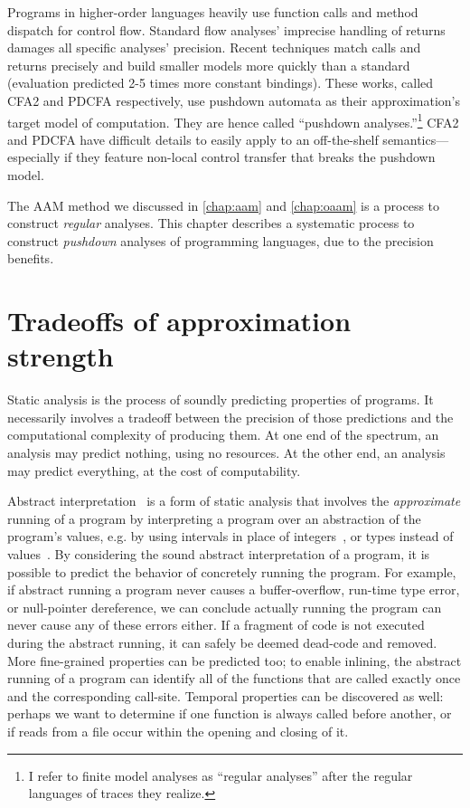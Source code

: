 Programs in higher-order languages heavily use function calls and method dispatch for control flow.
Standard flow analyses' imprecise handling of returns damages all specific analyses' precision.
Recent techniques match calls and returns precisely \citep{ianjohnson:vardoulakis-lmcs11, dvanhorn:Earl2010Pushdown} and build smaller models more quickly than a standard \zcfa (evaluation predicted 2-5 times more constant bindings).
These works, called CFA2 and PDCFA respectively, use pushdown automata as their approximation's target model of computation.
They are hence called ``pushdown analyses.''\footnote{I refer to finite model analyses as ``regular analyses'' after the regular languages of traces they realize.}
CFA2 and PDCFA have difficult details to easily apply to an off-the-shelf semantics---especially if they feature non-local control transfer that breaks the pushdown model.


The AAM method we discussed in \autoref{chap:aam} and \autoref{chap:oaam} is a process to construct \emph{regular} analyses.
This chapter describes a systematic process to construct \emph{pushdown} analyses of programming languages, due to the precision benefits.

\section{Tradeoffs of approximation strength}

Static analysis is the process of soundly predicting properties of
programs.
It necessarily involves a tradeoff between the precision of those
predictions and the computational complexity of producing them.
At one end of the spectrum, an analysis may predict nothing, using no
resources.  At the other end, an analysis may predict everything, at
the cost of computability.


Abstract interpretation~\cite{dvanhorn:Cousot:1977:AI} is a form of
static analysis that involves the \emph{approximate} running of a
program by interpreting a program over an abstraction of the program's
values, e.g. by using intervals in place of
integers~\cite{Cousot-TASE07tutorial}, or types instead of
values~\cite{dvanhorn:esop:kmf07}.
By considering the sound abstract interpretation of a program, it is
possible to predict the behavior of concretely running the program. 
For example, if abstract running a program never causes a
buffer-overflow, run-time type error, or null-pointer dereference, we
can conclude actually running the program can never cause any of these
errors either.  If a fragment of code is not executed during the
abstract running, it can safely be deemed dead-code and removed.  More
fine-grained properties can be predicted too; to enable inlining, the
abstract running of a program can identify all of the functions that
are called exactly once and the corresponding call-site.  Temporal
properties can be discovered as well: perhaps we want to determine if
one function is always called before another, or if reads from a file
occur within the opening and closing of it.


